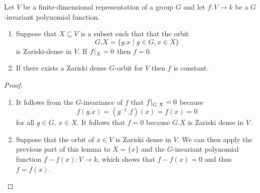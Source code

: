 \begin{lemma}\label{lemma: zariski density orbits}
  Let $V$ be a finite-dimensional representation of a group $G$ and let $f \colon V \to k$ be a $G$-invariant polynomial function.
  \begin{enumerate}
    \item
      Suppose that $X \subseteq V$ is a subset such that that the orbit
      \[
          G.X
        = \{
            g.x
          \mid
            g \in G,
            x \in X
          \}
      \]
      is Zariski-dense in $V$.
      If $\restrict{f}{X} = 0$ then $ f= 0$.
    \item
      If there exists a Zariski dense $G$-orbit for $V$ then $f$ is constant.
  \end{enumerate}
\end{lemma}
\begin{proof}
  \leavevmode
  \begin{enumerate}
    \item
      It follows from the $G$-invariance of $f$ that $\restrict{f}{G.X} = 0$ because
      \[
          f(g.x)
        = \left( g^{-1}.f \right)(x)
        = f(x)
        = 0
      \]
      for all $g \in G$, $x \in X$.
      It follows that $f = 0$ because $G.X$ is Zariski dense in $V$.
    \item
      Suppose that the orbit of $x \in V$ is Zariski dense in $V$.
      We can then apply the previous part of this lemma to $X = \{x\}$ and the $G$-invariant polynomial function $f - f(x) \colon V \to k$, which shows that $f - f(x) = 0$ and thus $f = f(x)$.
    \qedhere
  \end{enumerate}
\end{proof}


